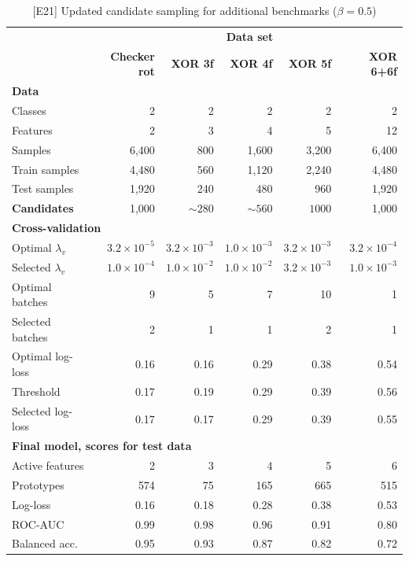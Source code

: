 %
\begin{table}
\caption{[E21] Updated candidate sampling for additional benchmarks ($\beta=0.5$)}
\label{tab_e21}
%
\begin{center}
\small
\begin{tabular}{|lrrrrr|}
\hline
&\multicolumn{5}{c|}{\textbf{\hrulefill\ Data set \hrulefill}}\\
&\textbf{Checker rot}&\textbf{XOR 3f}&\textbf{XOR 4f}&\textbf{XOR 5f}&\textbf{XOR 6+6f}\\
\multicolumn{6}{|l|}{\textbf{Data}}\\
Classes&2&2&2&2&2\\
Features&2&3&4&5&12\\
Samples&6,400&800&1,600&3,200&6,400\\
Train samples&4,480&560&1,120&2,240&4,480\\
Test samples&1,920&240&480&960&1,920\\
\textbf{Candidates}&1,000&$\sim280$&$\sim560$&$1000$&1,000\\
\multicolumn{6}{|l|}{\textbf{Cross-validation}}\\
Optimal $\lambda_v$&$3.2\times10^{-5}$&$3.2\times10^{-3}$&$1.0\times10^{-3}$&$3.2\times10^{-3}$&$3.2\times10^{-4}$\\
Selected $\lambda_v$&$1.0\times10^{-4}$&$1.0\times10^{-2}$&$1.0\times10^{-2}$&$3.2\times10^{-3}$&$1.0\times10^{-3}$\\
Optimal batches&9&5&7&10&1\\
Selected batches&2&1&1&2&1\\
Optimal log-loss&0.16&0.16&0.29&0.38&0.54\\
Threshold&0.17&0.19&0.29&0.39&0.56\\
Selected log-loss&0.17&0.17&0.29&0.39&0.55\\
\multicolumn{6}{|l|}{\textbf{Final model, scores for test data}}\\
Active features&2&3&4&5&6\\
Prototypes&574&75&165&665&515\\
Log-loss&0.16&0.18&0.28&0.38&0.53\\
ROC-AUC&0.99&0.98&0.96&0.91&0.80\\
Balanced acc.&0.95&0.93&0.87&0.82&0.72\\
\hline
\end{tabular}
\end{center}
\end{table}
%
